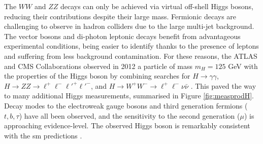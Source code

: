 The $WW$ and $ZZ$ decays can only be achieved via virtual off-shell Higgs bosons, reducing their contributions despite their large mass. Fermionic decays are challenging to observe in hadron colliders due to the large multi-jet background. The vector bosons and di-photon leptonic decays benefit from advantageous experimental conditions, being easier to identify thanks to the presence of leptons and suffering from less background contamination. For these reasons, the ATLAS and CMS Collaborations observed in 2012 a particle of mass $m_H = 125$ GeV with the properties of the Higgs boson by combining searches for $H \rightarrow \gamma\gamma$, $H \rightarrow ZZ \rightarrow \ell^+\ell^-\ell'^+\ell'^-$, and $H \rightarrow W^+W^- \rightarrow \ell^+\ell^-\nu \bar{\nu}$ \cite{ATLAS:2012yve, CMS:2012qbp}. This paved the way to many additional Higgs measurements, summarised in Figure \ref{fig:measprodH}. Decay modes to the electroweak gauge bosons and third generation fermions ($t, b, \tau$) have all been observed, and the sensitivity to the second generation ($\mu$) is approaching evidence-level. The observed Higgs boson is remarkably consistent with the \gls{sm} predictions \cite{ATLAS:2022vkf}. 
